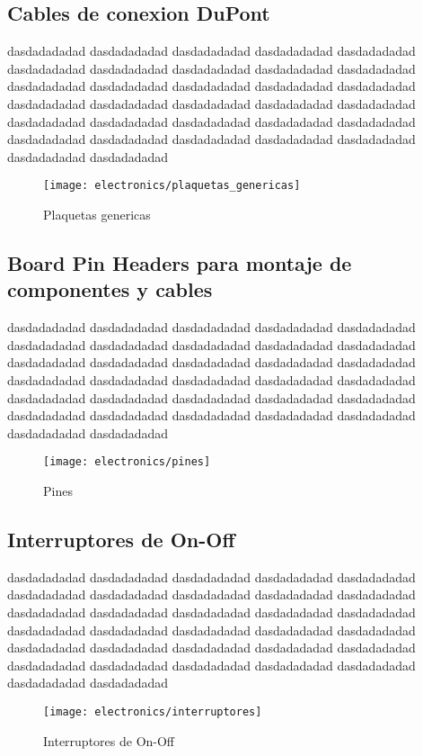 \subsection{Cables de conexion DuPont}
dasdadadadad dasdadadadad dasdadadadad dasdadadadad dasdadadadad dasdadadadad dasdadadadad dasdadadadad dasdadadadad dasdadadadad dasdadadadad dasdadadadad dasdadadadad dasdadadadad dasdadadadad dasdadadadad dasdadadadad dasdadadadad dasdadadadad dasdadadadad dasdadadadad dasdadadadad dasdadadadad dasdadadadad dasdadadadad dasdadadadad dasdadadadad dasdadadadad dasdadadadad dasdadadadad dasdadadadad dasdadadadad

\begin{figure}[h]
    \centering
    \texttt{[image: electronics/plaquetas\_genericas]}
    \caption{Plaquetas genericas}
    \label{fig:plaquetas_genericas}
\end{figure}

\subsection{Board Pin Headers para montaje de componentes y cables}
dasdadadadad dasdadadadad dasdadadadad dasdadadadad dasdadadadad dasdadadadad dasdadadadad dasdadadadad dasdadadadad dasdadadadad dasdadadadad dasdadadadad dasdadadadad dasdadadadad dasdadadadad dasdadadadad dasdadadadad dasdadadadad dasdadadadad dasdadadadad dasdadadadad dasdadadadad dasdadadadad dasdadadadad dasdadadadad dasdadadadad dasdadadadad dasdadadadad dasdadadadad dasdadadadad dasdadadadad dasdadadadad

\begin{figure}[h]
    \centering
    \texttt{[image: electronics/pines]}
    \caption{Pines}
    \label{fig:pines}
\end{figure}

\subsection{Interruptores de On-Off}
dasdadadadad dasdadadadad dasdadadadad dasdadadadad dasdadadadad dasdadadadad dasdadadadad dasdadadadad dasdadadadad dasdadadadad dasdadadadad dasdadadadad dasdadadadad dasdadadadad dasdadadadad dasdadadadad dasdadadadad dasdadadadad dasdadadadad dasdadadadad dasdadadadad dasdadadadad dasdadadadad dasdadadadad dasdadadadad dasdadadadad dasdadadadad dasdadadadad dasdadadadad dasdadadadad dasdadadadad dasdadadadad
\begin{figure}[h]
    \centering
    \texttt{[image: electronics/interruptores]}
    \caption{Interruptores de On-Off}
    \label{fig:interruptores}
\end{figure}

